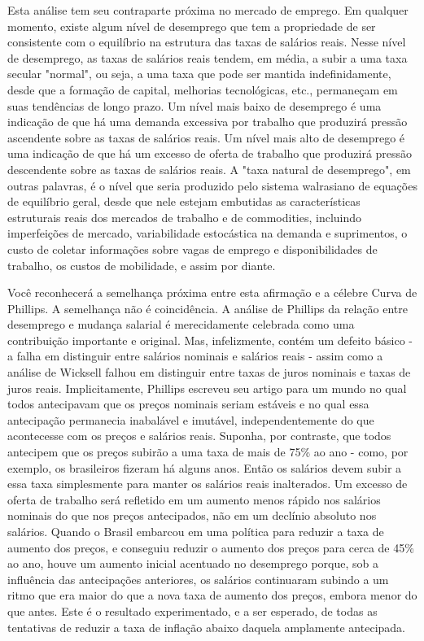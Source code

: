 \documentclass[a4paper,12pt]{article}[abntex2]
\begin{document}
Esta análise tem seu contraparte próxima no mercado de emprego. Em qualquer momento, existe algum nível de desemprego que tem a propriedade de ser consistente com o equilíbrio na estrutura das taxas de salários reais. Nesse nível de desemprego, as taxas de salários reais tendem, em média, a subir a uma taxa secular "normal", ou seja, a uma taxa que pode ser mantida indefinidamente, desde que a formação de capital, melhorias tecnológicas, etc., permaneçam em suas tendências de longo prazo. Um nível mais baixo de desemprego é uma indicação de que há uma demanda excessiva por trabalho que produzirá pressão ascendente sobre as taxas de salários reais. Um nível mais alto de desemprego é uma indicação de que há um excesso de oferta de trabalho que produzirá pressão descendente sobre as taxas de salários reais. A "taxa natural de desemprego", em outras palavras, é o nível que seria produzido pelo sistema walrasiano de equações de equilíbrio geral, desde que nele estejam embutidas as características estruturais reais dos mercados de trabalho e de commodities, incluindo imperfeições de mercado, variabilidade estocástica na demanda e suprimentos, o custo de coletar informações sobre vagas de emprego e disponibilidades de trabalho, os custos de mobilidade, e assim por diante.

Você reconhecerá a semelhança próxima entre esta afirmação e a célebre Curva de Phillips. A semelhança não é coincidência. A análise de Phillips da relação entre desemprego e mudança salarial é merecidamente celebrada como uma contribuição importante e original. Mas, infelizmente, contém um defeito básico - a falha em distinguir entre salários nominais e salários reais - assim como a análise de Wicksell falhou em distinguir entre taxas de juros nominais e taxas de juros reais. Implicitamente, Phillips escreveu seu artigo para um mundo no qual todos antecipavam que os preços nominais seriam estáveis e no qual essa antecipação permanecia inabalável e imutável, independentemente do que acontecesse com os preços e salários reais. Suponha, por contraste, que todos antecipem que os preços subirão a uma taxa de mais de 75\% ao ano - como, por exemplo, os brasileiros fizeram há alguns anos. Então os salários devem subir a essa taxa simplesmente para manter os salários reais inalterados. Um excesso de oferta de trabalho será refletido em um aumento menos rápido nos salários nominais do que nos preços antecipados, não em um declínio absoluto nos salários. Quando o Brasil embarcou em uma política para reduzir a taxa de aumento dos preços, e conseguiu reduzir o aumento dos preços para cerca de 45\% ao ano, houve um aumento inicial acentuado no desemprego porque, sob a influência das antecipações anteriores, os salários continuaram subindo a um ritmo que era maior do que a nova taxa de aumento dos preços, embora menor do que antes. Este é o resultado experimentado, e a ser esperado, de todas as tentativas de reduzir a taxa de inflação abaixo daquela amplamente antecipada.
\end{document}
